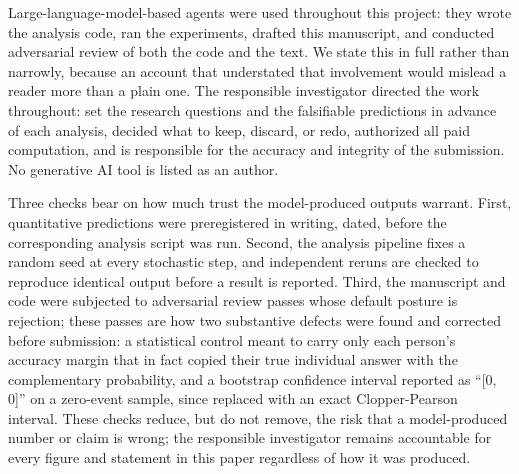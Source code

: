 \documentclass[sigconf,anonymous,review]{acmart}
\begin{document}
\begin{ai}

Large-language-model-based agents were used throughout this project: they wrote the analysis code, ran the experiments, drafted this manuscript, and conducted adversarial review of both the code and the text. We state this in full rather than narrowly, because an account that understated that involvement would mislead a reader more than a plain one. The responsible investigator directed the work throughout: set the research questions and the falsifiable predictions in advance of each analysis, decided what to keep, discard, or redo, authorized all paid computation, and is responsible for the accuracy and integrity of the submission. No generative AI tool is listed as an author.

Three checks bear on how much trust the model-produced outputs warrant. First, quantitative predictions were preregistered in writing, dated, before the corresponding analysis script was run. Second, the analysis pipeline fixes a random seed at every stochastic step, and independent reruns are checked to reproduce identical output before a result is reported. Third, the manuscript and code were subjected to adversarial review passes whose default posture is rejection; these passes are how two substantive defects were found and corrected before submission: a statistical control meant to carry only each person's accuracy margin that in fact copied their true individual answer with the complementary probability, and a bootstrap confidence interval reported as ``[0, 0]'' on a zero-event sample, since replaced with an exact Clopper-Pearson interval. These checks reduce, but do not remove, the risk that a model-produced number or claim is wrong; the responsible investigator remains accountable for every figure and statement in this paper regardless of how it was produced.

\end{ai}




\end{document}
